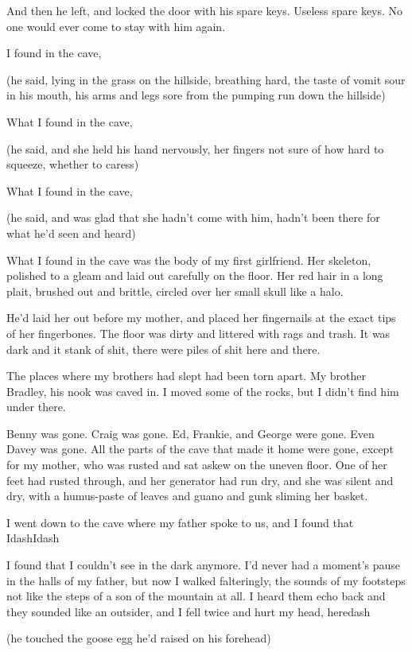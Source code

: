 And then he left, and locked the door with his spare keys.  Useless
spare keys.  No one would ever come to stay with him again.

 I found in the cave,

(he said, lying in the grass on the hillside, breathing hard, the
taste of vomit sour in his mouth, his arms and legs sore from the
pumping run down the hillside)

What I found in the cave,

(he said, and she held his hand nervously, her fingers not sure of how
hard to squeeze, whether to caress)

What I found in the cave,

(he said, and was glad that she hadn't come with him, hadn't been
there for what he'd seen and heard)

What I found in the cave was the body of my first girlfriend.  Her
skeleton, polished to a gleam and laid out carefully on the floor. 
Her red hair in a long plait, brushed out and brittle, circled over
her small skull like a halo.

He'd laid her out before my mother, and placed her fingernails at the
exact tips of her fingerbones.  The floor was dirty and littered with
rags and trash.  It was dark and it stank of shit, there were piles of
shit here and there.

The places where my brothers had slept had been torn apart.  My
brother Bradley, his nook was caved in.  I moved some of the rocks,
but I didn't find him under there.

Benny was gone.  Craig was gone.  Ed, Frankie, and George were gone. 
Even Davey was gone.  All the parts of the cave that made it home were
gone, except for my mother, who was rusted and sat askew on the uneven
floor.  One of her feet had rusted through, and her generator had run
dry, and she was silent and dry, with a humus-paste of leaves and
guano and gunk sliming her basket.

I went down to the cave where my father spoke to us, and I found that
Idash{}Idash{}

I found that I couldn't see in the dark anymore.  I'd never had a
moment's pause in the halls of my father, but now I walked
falteringly, the sounds of my footsteps not like the steps of a son of
the mountain at all.  I heard them echo back and they sounded like an
outsider, and I fell twice and hurt my head, heredash{}

(he touched the goose egg he'd raised on his forehead)

